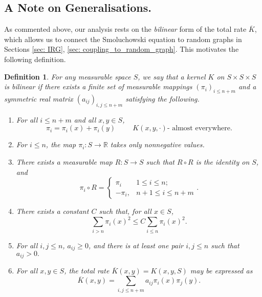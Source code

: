 \documentclass[11pt, notitlepage]{article}
\newtheorem{defn}{Definition}[section]
\begin{document}
\subsection{\textbf{A Note on Generalisations.}} As commented above, our analysis rests on the \emph{bilinear} form of the total rate $\overline{K}$, which allows us to connect the Smoluchowski equation to random graphs in Sections \ref{sec: IRG}, \ref{sec: coupling_to_random_graph}. This motivates the following definition.
\begin{defn} For any measurable space $S$, we say that a kernel $K$ on $S\times S\times S$ is \emph{bilinear} if there exists a finite set of measurable mappings $(\pi_i)_{i\le n+m}$ and a symmetric real matrix $(a_{ij})_{i, j\le n+m}$ satisfying the following. 
\begin{enumerate}[label=\roman{*}).]
\item For all $i\le n+m$ and all $x,y\in S$, \begin{equation} \pi_i=\pi_i(x)+\pi_i(y) \hspace{1cm}K(x,y,\cdot)\text{- almost everywhere}. \end{equation} \item For $i\le n$, the map $\pi_i:S\rightarrow \mathbb{R}$ takes only nonnegative values.
\item There exists a measurable map $R: S\rightarrow S$ such that $R\circ R$ is the identity on $S$, and  \begin{equation} \pi_i \circ R=\begin{cases} \pi_i & 1\le i\le n; \\ -\pi_i, & n+1\le i \le n+m \end{cases}.  \end{equation}
\item There exists a constant $C$ such that, for all $x\in S$, \begin{equation} \sum_{i> n} \pi_i(x)^2 \le C \sum_{i\le n} \pi_i(x)^2. \end{equation} \item For all $i, j\le n$, $a_{ij}\ge 0$, and there is at least one pair $i, j\le n$ such that $a_{ij}>0.$
\item For all $x,y\in S$, the total rate $\overline{K}(x,y)=K(x,y,S)$ may be expressed as \begin{equation} \overline{K}(x,y)=\sum_{i,j\le n+m}a_{ij}\pi_i(x)\pi_j(y). \end{equation}  
\end{enumerate}  \end{defn}
\end{document}
